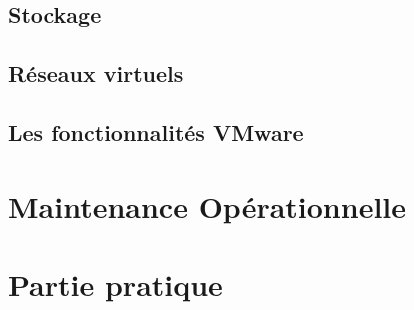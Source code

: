 \documentclass[10pt]{beamer}
\begin{document}
\subsection{Stockage}


\subsection{Réseaux virtuels}


\subsection{Les fonctionnalités VMware}


\section{Maintenance Opérationnelle}


\section{Partie pratique}

\end{document}
